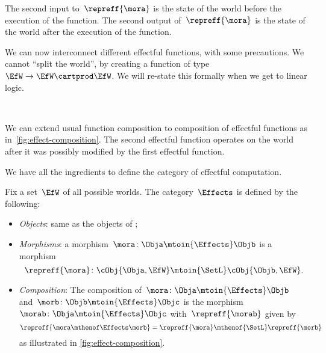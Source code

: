 The second input to~$\repreff{\mora}$ is the state of the world before the execution of the function.
The second output of~$\repreff{\mora}$ is the state of the world after the execution of the function.

We can now interconnect different effectful functions, with some precautions.
We cannot ``split the world'', by creating a function of type~$\EfW \to \EfW \cartprod \EfW$.
We will re-state this formally when we get to linear logic.

\begin{marginfigure}
    \centering
    \\
    \caption{}
    \label{fig:effect-composition}
\end{marginfigure}

We can extend usual function composition to composition of effectful functions as in~\cref{fig:effect-composition}.
The second effectful function operates on the world after it was possibly modified by the first effectful function.

We have all the ingredients to define the category \Effects of effectful computation.

\begin{definition}
    \label{def:Effects}
    Fix a set~$\EfW$ of all possible worlds.
    The category~$\Effects$ is defined by the following:
    \begin{itemize}
        \item \emph{Objects}: same as the objects of \SetL;
        \item \emph{Morphisms}: a morphism~$\mora\colon \Obja \mtoin{\Effects} \Objb$ is a morphism
              \begin{equation}
                  \repreff{\mora}\colon \cObj{\Obja, \EfW} \mtoin{\SetL} \cObj{\Objb, \EfW}.
              \end{equation}
        \item \emph{Composition}: The composition of~$\mora\colon \Obja \mtoin{\Effects} \Objb$ and~$\morb\colon \Objb \mtoin{\Effects} \Objc$ is the morphism~$\morab\colon \Obja \mtoin{\Effects} \Objc$ with~$\repreff{\morab}$ given by
              \begin{equation}
                  \repreff{\mora \mthenof \Effects \morb}
                  = \repreff{\mora} \mthenof{\SetL} \repreff{\morb}
              \end{equation}
              as illustrated in \cref{fig:effect-composition}.
    \end{itemize}
\end{definition}

